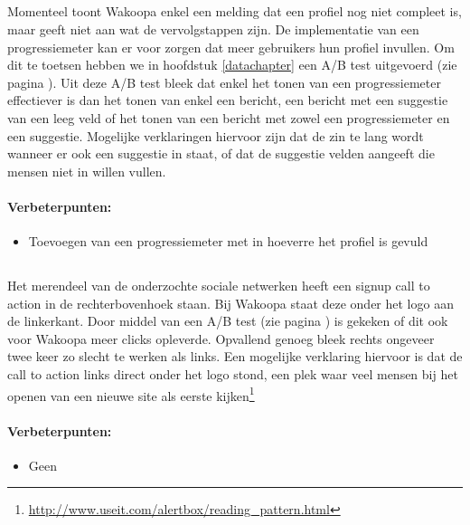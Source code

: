 \documentclass[a4paper, 10pt, pdftex]{report}
\begin{document}
    \subsection{\cite{Brouns2008}}
    Momenteel toont Wakoopa enkel een melding dat een profiel nog niet compleet is, maar geeft niet aan wat de vervolgstappen zijn. De implementatie van een progressiemeter kan er voor zorgen dat meer gebruikers hun profiel invullen. Om dit te toetsen hebben we in hoofdstuk \ref{datachapter} een A/B test uitgevoerd (zie pagina \pageref{profileprogress}). Uit deze A/B test bleek dat enkel het tonen van een progressiemeter effectiever is dan het tonen van enkel een bericht, een bericht met een suggestie van een leeg veld of het tonen van een bericht met zowel een progressiemeter en een suggestie. Mogelijke verklaringen hiervoor zijn dat de zin te lang wordt wanneer er ook een suggestie in staat, of dat de suggestie velden aangeeft die mensen niet in willen vullen.

      \paragraph{\textbf{Verbeterpunten:}}
      \begin{itemize}
        \item Toevoegen van een progressiemeter met in hoeverre het profiel is gevuld
      \end{itemize}

    \subsection{\cite{Editorial2008}}
    Het merendeel van de onderzochte sociale netwerken heeft een signup call to action in de rechterbovenhoek staan. Bij Wakoopa staat deze onder het logo aan de linkerkant. Door middel van een A/B test (zie pagina \pageref{ctatest}) is gekeken of dit ook voor Wakoopa meer clicks opleverde. Opvallend genoeg bleek rechts ongeveer twee keer zo slecht te werken als links. Een mogelijke verklaring hiervoor is dat de call to action links direct onder het logo stond, een plek waar veel mensen bij het openen van een nieuwe site als eerste kijken\footnote{\url{http://www.useit.com/alertbox/reading\_pattern.html}}

      \paragraph{\textbf{Verbeterpunten:}}
      \begin{itemize}
        \item Geen
      \end{itemize}
\end{document}

